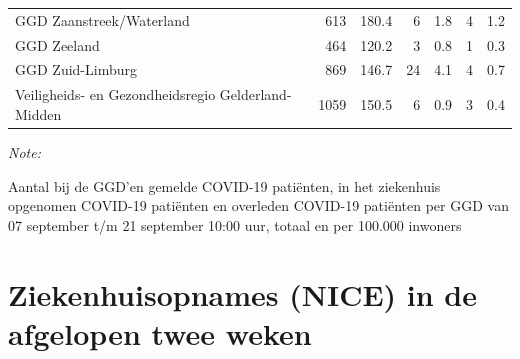 \documentclass[
  english,
  man,floatsintext]{apa6}
\begin{document}
\begin{table}
\begin{threeparttable}
\begin{tabular}{lrrrrrr}
GGD Zaanstreek/Waterland & 613 & 180.4 & 6 & 1.8 & 4 & 1.2\\
GGD Zeeland & 464 & 120.2 & 3 & 0.8 & 1 & 0.3\\
GGD Zuid-Limburg & 869 & 146.7 & 24 & 4.1 & 4 & 0.7\\
Veiligheids- en Gezondheidsregio Gelderland-Midden & 1059 & 150.5 & 6 & 0.9 & 3 & 0.4\\
\bottomrule
\end{tabular}
\begin{tablenotes}
\item \textit{Note: } 
\item Aantal bij de GGD’en gemelde COVID-19 patiënten, in het ziekenhuis opgenomen COVID-19 patiënten en overleden COVID-19 patiënten per GGD van 07 september t/m 21 september 10:00 uur, totaal en per 100.000 inwoners
\end{tablenotes}
\end{threeparttable}
\endgroup{}
\end{table}

\newpage

\hypertarget{ziekenhuisopnames-nice-in-de-afgelopen-twee-weken}{%
\section{Ziekenhuisopnames (NICE) in de afgelopen twee weken}\label{ziekenhuisopnames-nice-in-de-afgelopen-twee-weken}}
\end{document}
